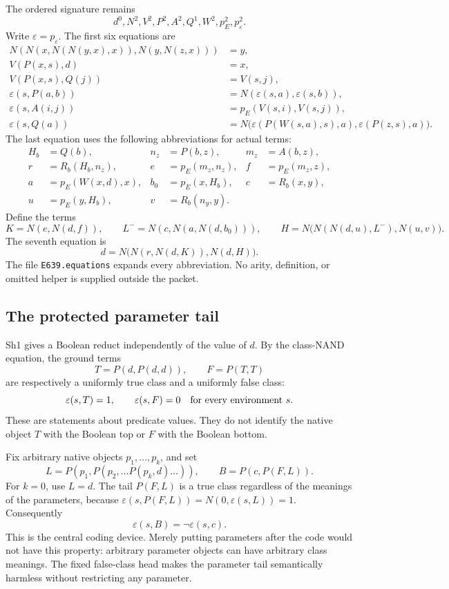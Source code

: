 The ordered signature remains
\[
 d^0,N^2,V^2,P^2,A^2,Q^1,W^2,p_E^2,p_\varepsilon^2.
\]
Write \(\varepsilon=p_\varepsilon\).  The first six equations are
\begin{align*}
 N(N(x,N(N(y,x),x)),N(y,N(z,x)))&=y,\\
 V(P(x,s),d)&=x,\\
 V(P(x,s),Q(j))&=V(s,j),\\
 \varepsilon(s,P(a,b))&=N(\varepsilon(s,a),\varepsilon(s,b)),\\
 \varepsilon(s,A(i,j))&=p_E(V(s,i),V(s,j)),\\
 \varepsilon(s,Q(a))
   &=N\bigl(\varepsilon(P(W(s,a),s),a),
            \varepsilon(P(z,s),a)\bigr).
\end{align*}
The last equation uses the following abbreviations for actual terms:
\begin{align*}
 H_b&=Q(b), & n_z&=P(b,z), & m_z&=A(b,z),\\
 r&=R_b(H_b,n_z), & e&=p_E(m_z,n_z), & f&=p_E(m_z,z),\\
 a&=p_E(W(x,d),x), & b_0&=p_E(x,H_b), & c&=R_b(x,y),\\
 u&=p_E(y,H_b), & v&=R_b(n_y,y).&&
\end{align*}
Define the terms
\[
 K=N(e,N(d,f)),\qquad
 L^-=N(c,N(a,N(d,b_0))),\qquad
 H=N\bigl(N(N(d,u),L^-),N(u,v)\bigr).
\]
The seventh equation is
\begin{equation}
                 d=N\bigl(N(r,N(d,K)),N(d,H)\bigr).
\label{eq:e639-closure}
\end{equation}
The file \texttt{E639.equations} expands every abbreviation.  No arity,
definition, or omitted helper is supplied outside the packet.

\subsection{The protected parameter tail}

Sh1 gives a Boolean reduct independently of the value of \(d\).  By the
class-NAND equation, the ground terms
\[
                    T=P(d,P(d,d)),\qquad F=P(T,T)
\]
are respectively a uniformly true class and a uniformly false class:
\[
 \varepsilon(s,T)=1,\qquad \varepsilon(s,F)=0
 \quad\hbox{for every environment }s.
\]
These are statements about predicate values.  They do not identify the
native object \(T\) with the Boolean top or \(F\) with the Boolean bottom.

Fix arbitrary native objects \(p_1,\ldots,p_k\), and set
\[
 L=P(p_1,P(p_2,\ldots P(p_k,d)\ldots)),\qquad
 B=P(c,P(F,L)).
\]
For \(k=0\), use \(L=d\).  The tail \(P(F,L)\) is a true class regardless
of the meanings of the parameters, because
\(\varepsilon(s,P(F,L))=N(0,\varepsilon(s,L))=1\).
Consequently
\begin{equation}
                       \varepsilon(s,B)=\neg\varepsilon(s,c).
\label{eq:e639-guard}
\end{equation}
This is the central coding device.  Merely putting parameters after the
code would not have this property: arbitrary parameter objects can have
arbitrary class meanings.  The fixed false-class head makes the parameter
tail semantically harmless without restricting any parameter.

